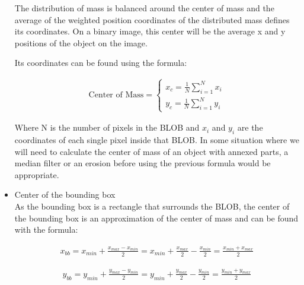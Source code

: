 \begin{itemize}
The distribution of mass is balanced around the center of mass and the average of the weighted position coordinates of the distributed mass defines its coordinates. On a binary image, this center will be the average x and y positions of the object on the image.

Its coordinates can be found using the formula:

\begin{equation}
	\begin{aligned}
  		\ \text{Center of Mass} = \left\{ \begin{array}{ll}
         x_{c}=\displaystyle\frac{1}{N} \displaystyle\sum_{i=1}^N x_{i}\\
         y_{c}=\displaystyle\frac{1}{N} \displaystyle\sum_{i=1}^N y_{i}
        \end{array} \right . \ 
 	\end{aligned}
\end{equation} 


Where N is the number of pixels in the BLOB and $x_i$ and $y_i$ are the coordinates of each single pixel inside that BLOB. In some situation where we will need to calculate the center of mass of an object with annexed parts, a median filter or an erosion before using the previous formula would be appropriate.\\
\item Center of the bounding box\\
As the bounding box is a rectangle that surrounds the BLOB, the center of the bounding box is an approximation of the center of mass and can be found with the formula:

\begin{equation}
	\begin{aligned}	x_{bb}=x_{min}+\displaystyle\frac{x_{max}-x_{min}}{2}=x_{min}+\displaystyle\frac{x_{max}}{2}-\displaystyle\frac{x_{min}}{2}=\displaystyle\frac{x_{min}+x_{max}}{2}
	\label{BoundingBoxCenterX}
	\end{aligned}
\end{equation}

\begin{equation}	
	\begin{aligned}
	y_{bb}=y_{min}+\displaystyle\frac{y_{max}-y_{min}}{2}=y_{min}+\displaystyle\frac{y_{max}}{2}-\displaystyle\frac{y_{min}}{2}=\displaystyle\frac{y_{min}+y_{max}}{2}
	\label{BoundingBoxCenterY}
	\end{aligned}
\end{equation}



\end{itemize}
